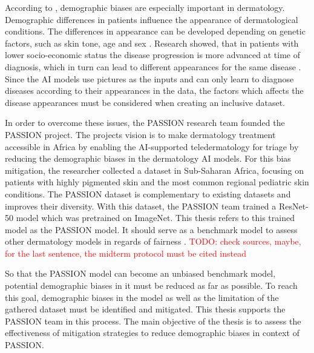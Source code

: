 \documentclass[12pt, a4paper, oneside]{book}   	%
\renewcommand{\todo}[1]{\textcolor{red}{TODO: #1}}
\begin{document}
		According to \textcite{Diaz2022}, demographic biases are especially important in dermatology. Demographic differences in patients influence the appearance of dermatological conditions. The differences in appearance can be developed depending on genetic factors, such as skin tone, age and sex \autocite{Diaz2022}. Research showed, that in patients with lower socio-economic status the disease progression is more advanced at time of diagnosis, which in turn can lead to different appearances for the same disease \autocite{BAD2021}. Since the AI models use pictures as the inputs and can only learn to diagnose diseases according to their appearances in the data, the factors which affects the disease appearances must be considered when creating an inclusive dataset.
		
		In order to overcome these issues, the PASSION research team founded the PASSION project. The projects vision is to make dermatology treatment accessible in Africa by enabling the AI-supported \gls{teledermatology} for triage by reducing the demographic biases in the dermatology AI models. For this bias mitigation, the researcher collected a dataset in Sub-Saharan Africa, focusing on patients with highly pigmented skin and the most common regional \gls{pediatric} skin conditions. The PASSION dataset is complementary to existing datasets and improves their diversity. With this dataset, the PASSION team trained a ResNet-50 model which was pretrained on ImageNet. This thesis refers to this trained model as the PASSION model. It should serve as a benchmark model to assess other dermatology models in regards of fairness \autocite{Gottfrois2024}. \todo{check sources, maybe, for the last sentence, the midterm protocol must be cited instead}
		
		So that the PASSION model can become an unbiased benchmark model, potential demographic biases in it must be reduced as far as possible. To reach this goal, demographic biases in the model as well as the limitation of the gathered dataset must be identified and mitigated. This thesis supports the PASSION team in this process. The main objective of the thesis is to assess the effectiveness of mitigation strategies to reduce demographic biases in context of PASSION.
		
		

		
\end{document}
